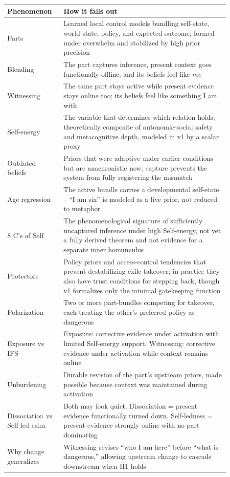 \documentclass[11pt]{article}
\begin{document}
\begin{table}[htbp]
\centering
\small
\begin{tabular}{|p{0.22\linewidth}|p{0.68\linewidth}|}
\hline
\textbf{Phenomenon} & \textbf{How it falls out} \\
\hline
Parts & Learned local control models bundling self-state, world-state, policy, and expected outcome; formed under overwhelm and stabilized by high prior precision \\
\hline
Blending & The part captures inference, present context goes functionally offline, and its beliefs feel like \emph{me} \\
\hline
Witnessing & The same part stays active while present evidence stays online too; its beliefs feel like something I am with \\
\hline
Self-energy & The variable that determines which relation holds; theoretically composite of autonomic-social safety and metacognitive depth, modeled in v1 by a scalar proxy \\
\hline
Outdated beliefs & Priors that were adaptive under earlier conditions but are anachronistic now; capture prevents the system from fully registering the mismatch \\
\hline
Age regression & The active bundle carries a developmental self-state -- ``I am six'' is modeled as a live prior, not reduced to metaphor \\
\hline
8 C's of Self & The phenomenological signature of sufficiently uncaptured inference under high Self-energy, not yet a fully derived theorem and not evidence for a separate inner homunculus \\
\hline
Protectors & Policy priors and access-control tendencies that prevent destabilizing exile takeover; in practice they also have trust conditions for stepping back, though v1 formalizes only the minimal gatekeeping function \\
\hline
Polarization & Two or more part-bundles competing for takeover, each treating the other's preferred policy as dangerous \\
\hline
Exposure vs IFS & Exposure: corrective evidence under activation with limited Self-energy support. Witnessing: corrective evidence under activation while context remains online \\
\hline
Unburdening & Durable revision of the part's upstream priors, made possible because context was maintained during activation \\
\hline
Dissociation vs Self-led calm & Both may look quiet. Dissociation = present evidence functionally turned down. Self-ledness = present evidence strongly online with no part dominating \\
\hline
Why change generalizes & Witnessing revises ``who I am here'' before ``what is dangerous,'' allowing upstream change to cascade downstream when H1 holds \\
\hline
\end{tabular}
\end{table}
\end{document}
